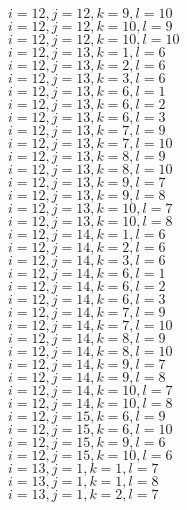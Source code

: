 \documentclass[14pt]{article}
\begin{document}
    $i=12,j=12,k=9,l=10 $ \\ 
    $i=12,j=12,k=10,l=9 $ \\ 
    $i=12,j=12,k=10,l=10 $ \\ 
    $i=12,j=13,k=1,l=6 $ \\ 
    $i=12,j=13,k=2,l=6 $ \\ 
    $i=12,j=13,k=3,l=6 $ \\ 
    $i=12,j=13,k=6,l=1 $ \\ 
    $i=12,j=13,k=6,l=2 $ \\ 
    $i=12,j=13,k=6,l=3 $ \\ 
    $i=12,j=13,k=7,l=9 $ \\ 
    $i=12,j=13,k=7,l=10 $ \\ 
    $i=12,j=13,k=8,l=9 $ \\ 
    $i=12,j=13,k=8,l=10 $ \\ 
    $i=12,j=13,k=9,l=7 $ \\ 
    $i=12,j=13,k=9,l=8 $ \\ 
    $i=12,j=13,k=10,l=7 $ \\ 
    $i=12,j=13,k=10,l=8 $ \\ 
    $i=12,j=14,k=1,l=6 $ \\ 
    $i=12,j=14,k=2,l=6 $ \\ 
    $i=12,j=14,k=3,l=6 $ \\ 
    $i=12,j=14,k=6,l=1 $ \\ 
    $i=12,j=14,k=6,l=2 $ \\ 
    $i=12,j=14,k=6,l=3 $ \\ 
    $i=12,j=14,k=7,l=9 $ \\ 
    $i=12,j=14,k=7,l=10 $ \\ 
    $i=12,j=14,k=8,l=9 $ \\ 
    $i=12,j=14,k=8,l=10 $ \\ 
    $i=12,j=14,k=9,l=7 $ \\ 
    $i=12,j=14,k=9,l=8 $ \\ 
    $i=12,j=14,k=10,l=7 $ \\ 
    $i=12,j=14,k=10,l=8 $ \\ 
    $i=12,j=15,k=6,l=9 $ \\ 
    $i=12,j=15,k=6,l=10 $ \\ 
    $i=12,j=15,k=9,l=6 $ \\ 
    $i=12,j=15,k=10,l=6 $ \\ 
    $i=13,j=1,k=1,l=7 $ \\ 
    $i=13,j=1,k=1,l=8 $ \\ 
    $i=13,j=1,k=2,l=7 $ \\ 
\end{document}
